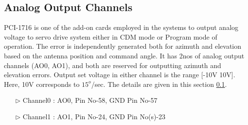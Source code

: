 \subsection{Analog Output Channels}
\label{SectionAO}
PCI-1716 is one of the add-on cards  employed in the systems to output analog voltage to servo drive system either in CDM mode or Program mode of operation. The error is independently generated both for azimuth and elevation based on the antenna position and command angle. It has 2nos of analog output channels (AO0, AO1), and both are reserved for outputting azimuth and elevation errors. Output set voltage in either channel is the range [-10V 10V]. Here, 10V corresponds to ${15}^{o}$/sec. The details are given in this section \ref{SectionAO}.
\begin{enumerate}
	\item [$\rhd$] Channel0 : AO0, Pin No-58, GND Pin No-57
	\item [$\rhd$] Channel1 : AO1, Pin No-24, GND Pin No(s)-23
\end{enumerate}
$\boldsymbol{}$
